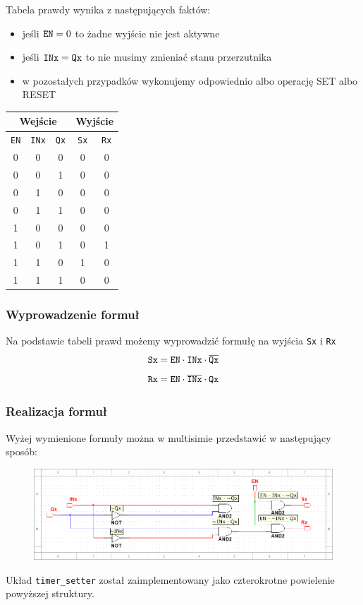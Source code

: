\documentclass[a4paper]{article}
\begin{document}
Tabela prawdy wynika z następujących faktów:
\begin{itemize}
    \item jeśli $ \verb|EN| = 0 $ to żadne wyjście nie jest aktywne
    \item jeśli $ \verb|INx| = \verb|Qx| $ to nie musimy zmieniać stanu przerzutnika
    \item w pozostałych przypadków wykonujemy odpowiednio albo operację SET albo RESET
\end{itemize}

\begin{center}
    \begin{tabular}{|c|c|c||c|c|}
    \hline \multicolumn{3}{|c||}{Wejście} & \multicolumn{2}{|c|}{Wyjście} \\
    \hline \verb|EN| & \verb|INx| & \verb|Qx| &  \verb|Sx| & \verb|Rx| \\
    \hline 0 & 0 & 0 & 0 & 0 \\
    \hline 0 & 0 & 1 & 0 & 0 \\
    \hline 0 & 1 & 0 & 0 & 0 \\
    \hline 0 & 1 & 1 & 0 & 0 \\
    \hline 1 & 0 & 0 & 0 & 0 \\
    \hline 1 & 0 & 1 & 0 & 1 \\
    \hline 1 & 1 & 0 & 1 & 0 \\
    \hline 1 & 1 & 1 & 0 & 0 \\
    \hline 
    \end{tabular}
\end{center}

\subsubsection{Wyprowadzenie formuł}
Na podstawie tabeli prawd możemy wyprowadzić formułę na wyjścia \verb|Sx| i \verb|Rx|
\[\verb|Sx| = \verb|EN| \cdot \verb|INx| \cdot \overline{\texttt{Qx}}\]
\[\verb|Rx| = \verb|EN| \cdot \overline{\texttt{INx}} \cdot \texttt{Qx}\]

\subsubsection{Realizacja formuł}
Wyżej wymienione formuły można w multisimie przedstawić w następujący sposób:
\begin{figure}[H]
    \centering
    \includegraphics[width=\textwidth]{model1.png}
\end{figure}
Układ \texttt{timer\_setter} został zaimplementowany jako czterokrotne powielenie powyższej struktury.
\end{document}

